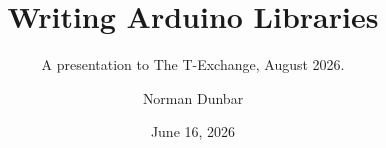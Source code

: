 \documentclass[graybox,envcountchap,sectrefs]{SVmonoND}
\begin{document}
\author{Norman Dunbar}
\title{Writing Arduino Libraries}
\date{June 16, 2026}
\subtitle{A presentation to The T-Exchange, August 2026.}

\maketitle

\frontmatter%

\tableofcontents




\mainmatter%










\appendixpage
\appendix




\backmatter%
%
%

\end{document}
